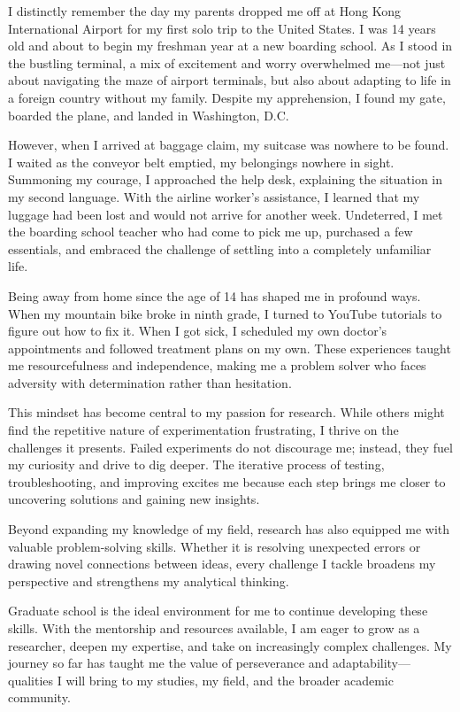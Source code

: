 \documentclass[10pt]{article}
\begin{document}
I distinctly remember the day my parents dropped me off at Hong Kong International Airport for my first solo trip to the United States. I was 14 years old and about to begin my freshman year at a new boarding school. As I stood in the bustling terminal, a mix of excitement and worry overwhelmed me—not just about navigating the maze of airport terminals, but also about adapting to life in a foreign country without my family. Despite my apprehension, I found my gate, boarded the plane, and landed in Washington, D.C.

However, when I arrived at baggage claim, my suitcase was nowhere to be found. I waited as the conveyor belt emptied, my belongings nowhere in sight. Summoning my courage, I approached the help desk, explaining the situation in my second language. With the airline worker's assistance, I learned that my luggage had been lost and would not arrive for another week. Undeterred, I met the boarding school teacher who had come to pick me up, purchased a few essentials, and embraced the challenge of settling into a completely unfamiliar life.

Being away from home since the age of 14 has shaped me in profound ways. When my mountain bike broke in ninth grade, I turned to YouTube tutorials to figure out how to fix it. When I got sick, I scheduled my own doctor's appointments and followed treatment plans on my own. These experiences taught me resourcefulness and independence, making me a problem solver who faces adversity with determination rather than hesitation.

This mindset has become central to my passion for research. While others might find the repetitive nature of experimentation frustrating, I thrive on the challenges it presents. Failed experiments do not discourage me; instead, they fuel my curiosity and drive to dig deeper. The iterative process of testing, troubleshooting, and improving excites me because each step brings me closer to uncovering solutions and gaining new insights.

Beyond expanding my knowledge of my field, research has also equipped me with valuable problem-solving skills. Whether it is resolving unexpected errors or drawing novel connections between ideas, every challenge I tackle broadens my perspective and strengthens my analytical thinking.

Graduate school is the ideal environment for me to continue developing these skills. With the mentorship and resources available, I am eager to grow as a researcher, deepen my expertise, and take on increasingly complex challenges. My journey so far has taught me the value of perseverance and adaptability—qualities I will bring to my studies, my field, and the broader academic community.
\end{document}
